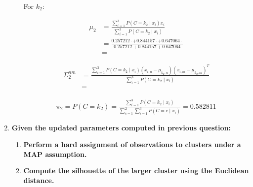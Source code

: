 \documentclass[12pt]{article}
\begin{document}
\begin{enumerate}[leftmargin=\labelsep]
\begin{itemize}[leftmargin=]
                For $k_2$:

                \begin{equation*}
                  \begin{aligned}
                    \mu_2 & = \frac{\sum_{i=1}^3 P(C = k_2 \mid x_i) x_i}{\sum_{i=1}^3 P(C = k_2 \mid x_i)}                                                                                      \\
                          & = \frac{0.257212 \cdot  + 0.844157 \cdot  + 0.647064 \cdot }{0.257212 + 0.844157 + 0.647064} \\
                          & = 
                  \end{aligned}
                \end{equation*}

                \begin{equation*}
                  \begin{aligned}
                    \Sigma_2^{nm} & = \frac{\sum_{i=1}^3 P(C = k_2 \mid x_i) (x_{i, n} - \mu_{k_2, n}) (x_{i, m} - \mu_{k_2, m})^T}{\sum_{i=1}^3 P(C = k_2 \mid x_i)} \\
                                  & = 
                  \end{aligned}
                \end{equation*}

                \begin{equation*}
                  \begin{aligned}
                    \pi_2 = P(C = k_2) = \frac{\sum_{i=1}^3 P(C = k_2 \mid x_i)}{\sum_{c=1}^2\sum_{i=1}^3 P(C = c \mid x_i)} = 0.582811
                  \end{aligned}
                \end{equation*}

        \end{itemize}

  \item \textbf{Given the updated parameters computed in previous question:}

        \begin{enumerate}[leftmargin=\labelsep]
          \item \textbf{Perform a hard assignment of observations to clusters under a MAP assumption.}
          \item \textbf{Compute the silhouette of the larger cluster using the Euclidean distance.}
        \end{enumerate}

\end{enumerate}
\end{document}
